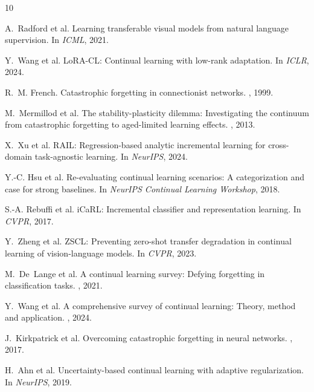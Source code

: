 \documentclass{article}
\begin{document}

\begin{thebibliography}{10}

A.~Radford et al.
\newblock Learning transferable visual models from natural language supervision.
\newblock In {\em ICML}, 2021.

Y.~Wang et al.
\newblock LoRA-CL: Continual learning with low-rank adaptation.
\newblock In {\em ICLR}, 2024.

R.~M. French.
\newblock Catastrophic forgetting in connectionist networks.
, 1999.

M.~Mermillod et al.
\newblock The stability-plasticity dilemma: Investigating the continuum from catastrophic forgetting to aged-limited learning effects.
, 2013.

X.~Xu et al.
\newblock RAIL: Regression-based analytic incremental learning for cross-domain task-agnostic learning.
\newblock In {\em NeurIPS}, 2024.

Y.-C. Hsu et al.
\newblock Re-evaluating continual learning scenarios: A categorization and case for strong baselines.
\newblock In {\em NeurIPS Continual Learning Workshop}, 2018.

S.-A. Rebuffi et al.
\newblock iCaRL: Incremental classifier and representation learning.
\newblock In {\em CVPR}, 2017.

Y.~Zheng et al.
\newblock ZSCL: Preventing zero-shot transfer degradation in continual learning of vision-language models.
\newblock In {\em CVPR}, 2023.

M.~De~Lange et al.
\newblock A continual learning survey: Defying forgetting in classification tasks.
, 2021.

Y.~Wang et al.
\newblock A comprehensive survey of continual learning: Theory, method and application.
, 2024.

J.~Kirkpatrick et al.
\newblock Overcoming catastrophic forgetting in neural networks.
, 2017.

H.~Ahn et al.
\newblock Uncertainty-based continual learning with adaptive regularization.
\newblock In {\em NeurIPS}, 2019.


\end{thebibliography}
\end{document}
